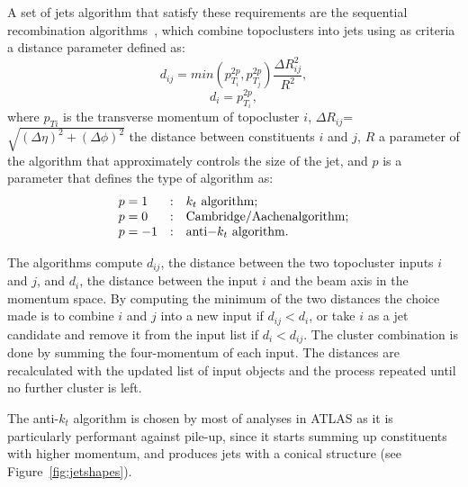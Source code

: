A set of jets algorithm that satisfy these requirements are the sequential recombination
algorithms~\cite{ref:Cacciari2008,ref:Cacciari2006,ref:fastjet}, which combine topoclusters
into jets using as criteria a distance parameter defined as:
\begin{equation}
d_{ij}=min(p_{T_i}^{2p},p_{T_j}^{2p})\frac{\Delta R_{ij}^{2}}{R^{2}},
\end{equation}
\begin{equation}
d_{i}=p_{T_i}^{2p},
\end{equation}
where $p_{Ti}$ is the transverse momentum of topocluster $i$, 
$\Delta R_{ij}$=$\sqrt{(\Delta\eta)^{2}+(\Delta\phi)^{2}}$ the distance 
between constituents $i$ and
$j$, $R$ a parameter of the algorithm that approximately controls the size
of the jet, and $p$ is a  parameter that defines the type of algorithm as:
\begin{equation}\label{eq:jetalgp}
\begin{array}{lcl}
p = 1 &:& k_t {\rm\ algorithm};\\
p = 0 &:& {\rm Cambridge/Aachen algorithm};\\
p = -1 &:& {\rm anti-}k_t {\rm\ algorithm}.
\end{array}
\end{equation}

The algorithms compute $d_{ij}$, the distance between the two topocluster
inputs $i$ and $j$, and $d_{i}$,  the distance between the input $i$
and the beam axis in the momentum space.
By computing the minimum of the two distances the choice made is
to combine $i$ and $j$ into a new input if $d_{ij}<d_{i}$, or take
$i$ as a jet candidate and remove it from the input list if $d_{i}<d_{ij}$. 
The cluster combination is done by summing the four-momentum of each input.
The distances are recalculated with the updated list of input
objects and the process repeated until no further cluster is left.

The anti-$k_t$ algorithm is chosen by most of analyses in ATLAS as it is particularly 
performant against pile-up, since it starts summing up 
constituents with higher momentum, and produces jets with a conical
structure (see Figure~\ref{fig:jetshapes}).

